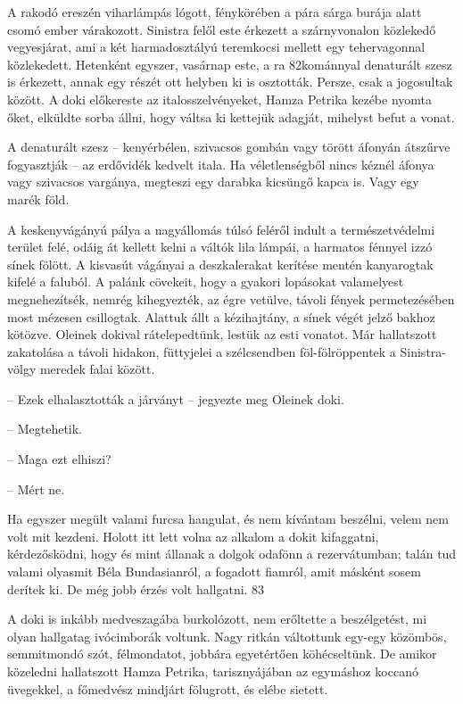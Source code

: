 \documentclass{IEEEtran}
\begin{document}
A rakodó ereszén viharlámpás lógott, fénykörében a pára sárga burája alatt
csomó ember várakozott. Sinistra felől este érkezett a szárnyvonalon közlekedő
vegyesjárat, ami a két harmadosztályú teremkocsi mellett egy tehervagonnal
közlekedett. Hetenként egyszer, vasárnap este, a ra 82kománnyal denaturált
szesz is érkezett, annak egy részét ott helyben ki is osztották. Persze, csak
a jogosultak között. A doki előkereste az italosszelvényeket, Hamza Petrika
kezébe nyomta őket, elküldte sorba állni, hogy váltsa ki kettejük adagját,
mihelyst befut a vonat.

A denaturált szesz – kenyérbélen, szivacsos gombán vagy törött áfonyán
átszűrve fogyasztják – az erdővidék kedvelt itala. Ha véletlenségből nincs
kéznél áfonya vagy szivacsos vargánya, megteszi egy darabka kicsüngő kapca is.
Vagy egy marék föld.

A keskenyvágányú pálya a nagyállomás túlsó feléről indult a természetvédelmi
terület felé, odáig át kellett kelni a váltók lila lámpái, a harmatos fénnyel
izzó sínek fölött. A kisvasút vágányai a deszkalerakat kerítése mentén
kanyarogtak kifelé a faluból. A palánk cövekeit, hogy a gyakori lopásokat
valamelyest megnehezítsék, nemrég kihegyezték, az égre vetülve, távoli fények
permetezésében most mézesen csillogtak. Alattuk állt a kézihajtány, a sínek
végét jelző bakhoz kötözve. Oleinek dokival rátelepedtünk, lestük az esti
vonatot. Már hallatszott zakatolása a távoli hidakon, füttyjelei a
szélcsendben föl-fölröppentek a Sinistra-völgy meredek falai között.

– Ezek elhalasztották a járványt – jegyezte meg Oleinek doki.

– Megtehetik.

– Maga ezt elhiszi?

– Mért ne.

Ha egyszer megült valami furcsa hangulat, és nem kívántam beszélni, velem nem
volt mit kezdeni. Holott itt lett volna az alkalom a dokit kifaggatni,
kérdezősködni, hogy és mint állanak a dolgok odafönn a rezervátumban; talán
tud valami olyasmit Béla Bundasianról, a fogadott fiamról, amit másként sosem
derítek ki. De még jobb érzés volt hallgatni.
83

A doki is inkább medveszagába burkolózott, nem erőltette a beszélgetést, mi
olyan hallgatag ivócimborák voltunk. Nagy ritkán váltottunk egy-egy közömbös,
semmitmondó szót, félmondatot, jobbára egyetértően köhécseltünk. De amikor
közeledni hallatszott Hamza Petrika, tarisznyájában az egymáshoz koccanó
üvegekkel, a főmedvész mindjárt fölugrott, és elébe sietett.
\end{document}

